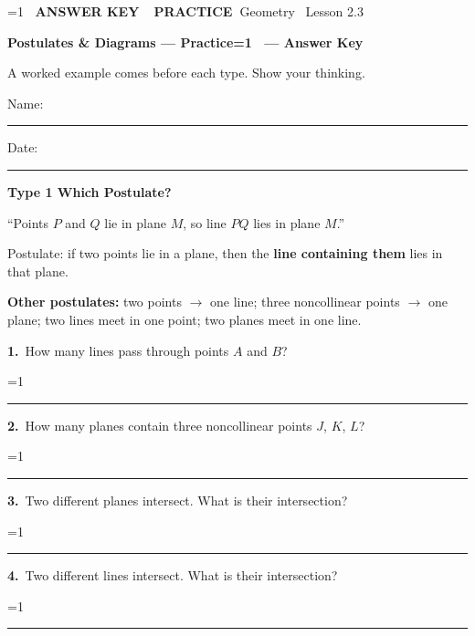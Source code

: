\documentclass[11pt,letterpaper]{article}
\newcommand{\badge}[1]{\colorbox{fmtitle}{\color{white}\bfseries\small\ #1\ }}
\newcommand{\topicbar}[1]{\needspace{4.5cm}\par\vspace{5mm}
  \begin{tcolorbox}[enhanced,colback=fmtitle,colframe=fmtitle,arc=2mm,left=4mm,top=1.5mm,bottom=1.5mm]
  \color{white}\bfseries\large #1
  \end{tcolorbox}}
\providecommand{\iskey}{0}
\newcommand{\pans}[2][3.2cm]{\ifnum\iskey=1 \underline{\makebox[#1][c]{\color{fmmistake}\bfseries #2}}\else\rule{#1}{0.4pt}\fi}
\newcommand{\sdp}[3]{\begin{minipage}[t][2.4cm]{0.48\linewidth}{\color{fmturn}\bfseries #1.}\ #2\par\vfill\hfill \pans[3.6cm]{#3}\end{minipage}}
\newlength{\pw}
\renewcommand{\pans}[2][3.2cm]{\ifnum\iskey=1 \settowidth{\pw}{\bfseries #2}\ifdim\pw>#1 \parbox[b]{#1}{\raggedleft\color{fmmistake}\bfseries\small #2}\else\underline{\makebox[#1][c]{\color{fmmistake}\bfseries #2}}\fi\else\rule{#1}{0.4pt}\fi}
\begin{document}
\ifnum\iskey=1 \colorbox{fmwatch}{\color{white}\bfseries\small\ ANSWER KEY\ }\else\badge{PRACTICE}\fi\hfill{\small\color{fmgray}Geometry \textperiodcentered\ Lesson 2.3}\par\vspace{4mm}
{\color{fmtitle}\LARGE\bfseries Postulates \& Diagrams --- Practice\ifnum\iskey=1 \ --- Answer Key\fi}\par\vspace{1mm}
{\color{fmgray}A worked example comes before each type. Show your thinking.}\par\vspace{3mm}
Name: \rule{6cm}{0.4pt}\hspace{1cm}Date: \rule{3.5cm}{0.4pt}\par\vspace{2mm}

\needspace{6cm}\topicbar{Type 1 \quad Which Postulate?}
\begin{watchme}``Points $P$ and $Q$ lie in plane $M$, so line $PQ$ lies in plane $M$.''\par
Postulate: if two points lie in a plane, then the \textbf{line containing them} lies in that plane.\par
\textbf{Other postulates:} two points $\to$ one line; three noncollinear points $\to$ one plane; two lines meet in one point; two planes meet in one line.\end{watchme}
\needspace{3.4cm}\noindent\sdp{1}{How many lines pass through points $A$ and $B$?}{exactly one}\hfill\sdp{2}{How many planes contain three noncollinear points $J$, $K$, $L$?}{exactly one}\par\vspace{2mm}
\needspace{3.4cm}\noindent\sdp{3}{Two different planes intersect. What is their intersection?}{a line}\hfill\sdp{4}{Two different lines intersect. What is their intersection?}{a point}\par
\end{document}
